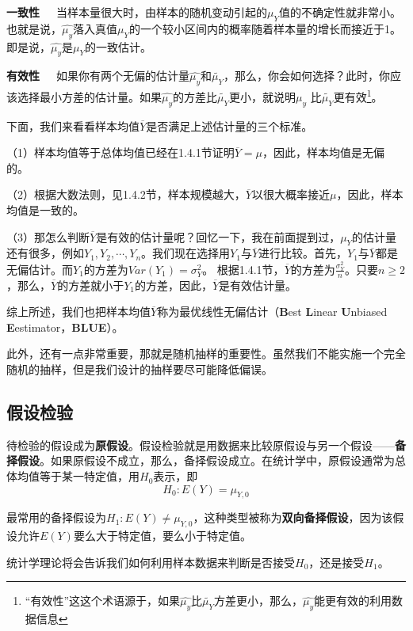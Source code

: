 \documentclass[cn,12pt,math=newtx,citestyle=gb7714-2015,bibstyle=gb7714-2015]{elegantbook}
\begin{document}
	\textbf{一致性}~~~当样本量很大时，由样本的随机变动引起的$\mu_Y$值的不确定性就非常小。也就是说，$\hat{\mu_y}$落入真值$\mu_Y$的一个较小区间内的概率随着样本量的增长而接近于1。即是说，$\hat{\mu_y}$是$\mu_Y$的一致估计。
	
	\textbf{有效性}~~~如果你有两个无偏的估计量$\hat{\mu_y}$和$\tilde{\mu_Y}$，那么，你会如何选择？此时，你应该选择最小方差的估计量。如果$\hat{\mu_y}$的方差比$\tilde{\mu_Y}$更小，就说明$\hat{\mu_y}$ 比$\tilde{\mu_Y}$更有效\footnote{“有效性”这这个术语源于，如果$\hat{\mu_y}$比$\tilde{\mu_Y}$方差更小，那么，$\hat{\mu_y}$能更有效的利用数据信息}。
	
	下面，我们来看看样本均值$\overline{Y}$是否满足上述估计量的三个标准。
	
	（1）样本均值等于总体均值已经在1.4.1节证明$\overline{Y}=\mu$，因此，样本均值是无偏的。
	
	（2）根据大数法则，见1.4.2节，样本规模越大，$\overline{Y}$以很大概率接近$\mu$，因此，样本均值是一致的。
	
	（3）那怎么判断$\overline{Y}$是有效的估计量呢？回忆一下，我在前面提到过，$\mu_Y$的估计量还有很多，例如$Y_1,Y_2,\cdots,Y_n$。我们现在选择用$Y_1$与$\overline{Y}$进行比较。首先，$Y_1$与$\overline{Y}$都是无偏估计。而$Y_1$的方差为$Var(Y_1)=\sigma_Y^2$。 根据1.4.1节，$\overline{Y}$的方差为$\frac{\sigma_Y^2}{n}$。只要$n\ge2$，那么，$\overline{Y}$的方差就小于$Y_1$的方差，因此，$\overline{Y}$是有效估计量。
	
	综上所述，我们也把样本均值$\overline{Y}$称为最优线性无偏估计（\textbf{B}est \textbf{L}inear \textbf{U}nbiased \textbf{E}estimator，\textbf{BLUE}）。
	
	此外，还有一点非常重要，那就是随机抽样的重要性。虽然我们不能实施一个完全随机的抽样，但是我们设计的抽样要尽可能降低偏误。
	
	\subsection{假设检验}
	待检验的假设成为\textbf{原假设}。假设检验就是用数据来比较原假设与另一个假设——\textbf{备择假设}。如果原假设不成立，那么，备择假设成立。在统计学中，原假设通常为总体均值等于某一特定值，用$H_0$表示，即
	\begin{equation}
		H_0:E(Y)=\mu_{Y,0}
	\end{equation}
	
	最常用的备择假设为$H_1:E(Y)\neq\mu_{Y,0}$，这种类型被称为\textbf{双向备择假设}，因为该假设允许$E(Y)$要么大于特定值，要么小于特定值。
	
	统计学理论将会告诉我们如何利用样本数据来判断是否接受$H_0$，还是接受$H_1$。
	
\end{document}
